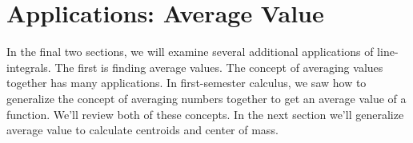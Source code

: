 \documentclass[10pt,]{book}
\theoremstyle{plain}
\theoremstyle{definition}
\theoremstyle{definition}
\theoremstyle{definition}
\theoremstyle{definition}
\theoremstyle{definition}
\numberwithin{equation}{section}
\begin{document}
\typeout{************************************************}
\typeout{************************************************}
\section[{Applications: Average Value}]{Applications: Average Value}\label{ch09_04_average}
In the final two sections, we will examine several additional applications of line-integrals. The first is finding average values. The concept of averaging values together has many applications. In first-semester calculus, we saw how to generalize the concept of averaging numbers together to get an average value of a function. We'll review both of these concepts. In the next section we'll generalize average value to calculate centroids and center of mass.%
\end{document}
